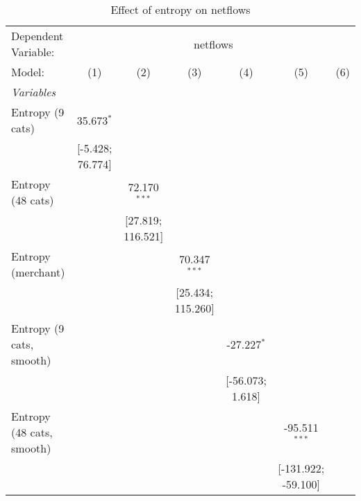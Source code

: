 
\begin{table}[htbp]
   \centering
   \tiny
   \begin{threeparttable}[b]
      \caption{\label{tab:reg_netflows} Effect of entropy on netflows}
      \begin{tabular}{lcccccc}
         \tabularnewline \midrule \midrule
         Dependent Variable: & \multicolumn{6}{c}{netflows}\\
         Model:                     & (1)                  & (2)                  & (3)                  & (4)                  & (5)                  & (6)\\  
         \midrule
         \emph{Variables}\\
         Entropy (9 cats)           & 35.673$^{*}$         &                      &                      &                      &                      &   \\   
                                    & [-5.428; 76.774]     &                      &                      &                      &                      &   \\   
         Entropy (48 cats)          &                      & 72.170$^{***}$       &                      &                      &                      &   \\   
                                    &                      & [27.819; 116.521]    &                      &                      &                      &   \\   
         Entropy (merchant)         &                      &                      & 70.347$^{***}$       &                      &                      &   \\   
                                    &                      &                      & [25.434; 115.260]    &                      &                      &   \\   
         Entropy (9 cats, smooth)   &                      &                      &                      & -27.227$^{*}$        &                      &   \\   
                                    &                      &                      &                      & [-56.073; 1.618]     &                      &   \\   
         Entropy (48 cats, smooth)  &                      &                      &                      &                      & -95.511$^{***}$      &   \\   
                                    &                      &                      &                      &                      & [-131.922; -59.100]  &   \\   

\end{tabular}
\end{threeparttable}
\end{table}
